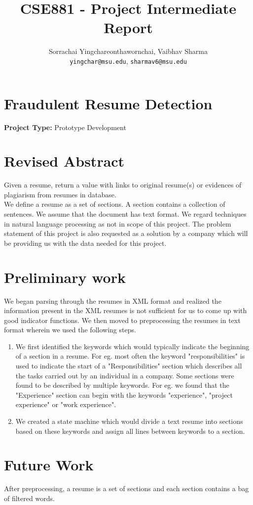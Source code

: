 \documentclass{article}
\title{CSE881 - Project Intermediate Report}
\author{Sorrachai Yingchareonthawornchai, Vaibhav Sharma \\
 \texttt{yingchar@msu.edu}, \texttt{sharmav6@msu.edu}\\
}
\begin{document}
\maketitle

\section*{ Fraudulent Resume Detection }
\textbf{Project Type:} Prototype Development


\section{Revised Abstract} Given a resume, return a value with links to original resume(s) or evidences of plagiarism from resumes in database. \\
We define a resume as a set of sections. A section contains a collection of sentences. We assume that the document has text format. We regard techniques in natural language processing as not in scope of this project. The problem statement of this project is also requested as a solution by a company which will be providing us with the data needed for this project.

\section{Preliminary work}
We began parsing through the resumes in XML format and realized the information present in the XML resumes is not sufficient for us to come up with good indicator functions. We then moved to preprocessing the resumes in text format wherein we used the following steps.
\begin{enumerate}
\item We first identified the keywords which would typically indicate the beginning of a section in a resume. For eg. most often the keyword "responsibilities" is used to indicate the start of a "Responsibilities" section which describes all the tasks carried out by an individual in a company. Some sections were found to be described by multiple keywords. For eg. we found that the "Experience" section can begin with the keywords "experience", "project experience" or "work experience".
\item We created a state machine which would divide a text resume into sections based on these keywords and assign all lines between keywords to a section.
\end{enumerate}

\section{Future Work}
After preprocessing, a resume is a set of sections and each section contains a bag of filtered words.
\end{document}

